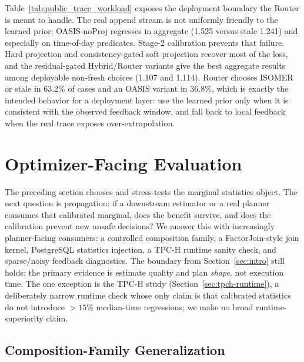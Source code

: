 \documentclass[preprint,12pt]{elsarticle}
\begin{document}


Table~\ref{tab:public_trace_workload} exposes the deployment boundary the
Router is meant to handle. The real append stream is not uniformly friendly to
the learned prior: OASIS-noProj regresses in aggregate (1.525 versus stale 1.241)
and especially on time-of-day predicates. Stage-2 calibration prevents that
failure. Hard projection and consistency-gated soft projection recover most of the
loss, and the residual-gated Hybrid/Router variants give the best aggregate
results among deployable non-fresh choices (1.107 and 1.114). Router chooses
ISOMER or stale in 63.2\% of cases and an OASIS variant in 36.8\%,
which is exactly the intended behavior for a deployment layer: use the learned
prior only when it is consistent with the observed feedback window, and fall
back to local feedback when the real trace exposes over-extrapolation.

\section{Optimizer-Facing Evaluation}
\label{sec:optimizer-facing}

The preceding section chooses and stress-tests the marginal statistics object.
The next question is propagation: if a downstream estimator or a real planner
consumes that calibrated marginal, does the benefit survive, and does the
calibration prevent new unsafe decisions? We answer this with increasingly
planner-facing consumers: a controlled composition family, a FactorJoin-style
join kernel, PostgreSQL statistics injection, a TPC-H runtime sanity check, and
sparse/noisy feedback diagnostics. The boundary from Section~\ref{sec:intro}
still holds: the primary evidence is estimate quality and plan \emph{shape}, not
execution time. The one exception is the TPC-H study
(Section~\ref{sec:tpch-runtime}), a deliberately narrow runtime check whose only
claim is that calibrated statistics do not introduce $>15\%$ median-time
regressions; we make no broad runtime-superiority claim.

\subsection{Composition-Family Generalization}
\label{sec:composition-family}
\end{document}
